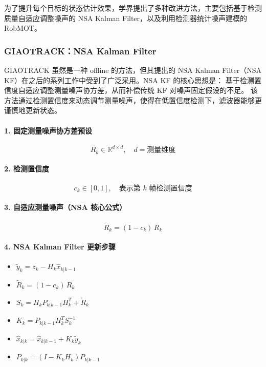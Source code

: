 \documentclass{article}
\begin{document}
为了提升每个目标的状态估计效果，学界提出了多种改进方法，主要包括基于检测质量自适应调整噪声的 NSA Kalman Filter，以及利用检测器统计噪声建模的 RobMOT。

\subsubsection*{GIAOTRACK：NSA Kalman Filter}

GIAOTRACK 虽然是一种 offline 的方法，但其提出的 NSA Kalman Filter（NSA KF）在之后的系列工作中受到了广泛采用。NSA KF 的核心思想是：
基于检测置信度自适应调整测量噪声协方差，从而补偿传统 KF 对噪声固定假设的不足。
该方法通过检测置信度来动态调节测量噪声，使得在低置信度检测下，滤波器能够更谨慎地更新状态。

\paragraph{1. 固定测量噪声协方差预设}

\[
R_k \in \mathbb{R}^{d \times d}, \quad d=\text{测量维度}
\]

\paragraph{2. 检测置信度}

\[
c_k \in [0,1], \quad \text{表示第 $k$ 帧检测置信度}
\]

\paragraph{3. 自适应测量噪声（NSA 核心公式）}

\begin{equation}
\tilde{R}_{k} = (1 - c_k)\, R_k
\end{equation}

\paragraph{4. NSA Kalman Filter 更新步骤}

\begin{itemize}[leftmargin=10em,itemsep=2pt,parsep=0pt]
    \item $\tilde{y}_k = z_k - H_k \hat{x}_{k|k-1}$
    \item $\tilde{R}_k = (1 - c_k)\, R_k$
    \item $S_k = H_k P_{k|k-1} H_k^{T} + \tilde{R}_k$
    \item $K_k = P_{k|k-1} H_k^{T} S_k^{-1}$
    \item $\hat{x}_{k|k} = \hat{x}_{k|k-1} + K_k \tilde{y}_k$
    \item $P_{k|k} = (I - K_k H_k) P_{k|k-1}$
\end{itemize}
\end{document}
